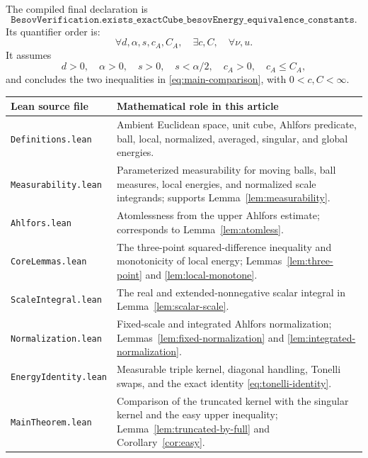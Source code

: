\documentclass[11pt]{article}
\theoremstyle{remark}
\begin{document}
The compiled final declaration is
\[
  \texttt{BesovVerification.}
  \texttt{exists\_exactCube\_besovEnergy\_equivalence\_constants}.
\]
Its quantifier order is:
\[
  \forall d,\alpha,s,c_A,C_A,\quad
  \exists c,C,\quad
  \forall\nu,u.
\]
It assumes
\[
  d>0,\quad
  \alpha>0,\quad
  s>0,\quad
  s<\alpha/2,\quad
  c_A>0,\quad
  c_A\leq C_A,
\]
and concludes the two inequalities in
\eqref{eq:main-comparison}, with \(0<c,C<\infty\).

\begin{center}
\small
\begin{tabular}{@{}
  >{\raggedright\arraybackslash}p{}
  >{\raggedright\arraybackslash}p{}@{}}
\toprule
Lean source file & Mathematical role in this article\\
\midrule
\texttt{Definitions.lean}
&
Ambient Euclidean space, unit cube, Ahlfors predicate, ball, local,
normalized, averaged, singular, and global energies.\\

\texttt{Measurability.lean}
&
Parameterized measurability for moving balls, ball measures, local
energies, and normalized scale integrands; supports
Lemma~\ref{lem:measurability}.\\

\texttt{Ahlfors.lean}
&
Atomlessness from the upper Ahlfors estimate; corresponds to
Lemma~\ref{lem:atomless}.\\

\texttt{CoreLemmas.lean}
&
The three-point squared-difference inequality and monotonicity of local
energy; Lemmas~\ref{lem:three-point} and \ref{lem:local-monotone}.\\

\texttt{ScaleIntegral.lean}
&
The real and extended-nonnegative scalar integral in
Lemma~\ref{lem:scalar-scale}.\\

\texttt{Normalization.lean}
&
Fixed-scale and integrated Ahlfors normalization;
Lemmas~\ref{lem:fixed-normalization} and
\ref{lem:integrated-normalization}.\\

\texttt{EnergyIdentity.lean}
&
Measurable triple kernel, diagonal handling, Tonelli swaps, and the exact
identity \eqref{eq:tonelli-identity}.\\

\texttt{MainTheorem.lean}
&
Comparison of the truncated kernel with the singular kernel and the easy
upper inequality; Lemma~\ref{lem:truncated-by-full} and
Corollary~\ref{cor:easy}.\\


\end{tabular}
\end{center}
\end{document}

